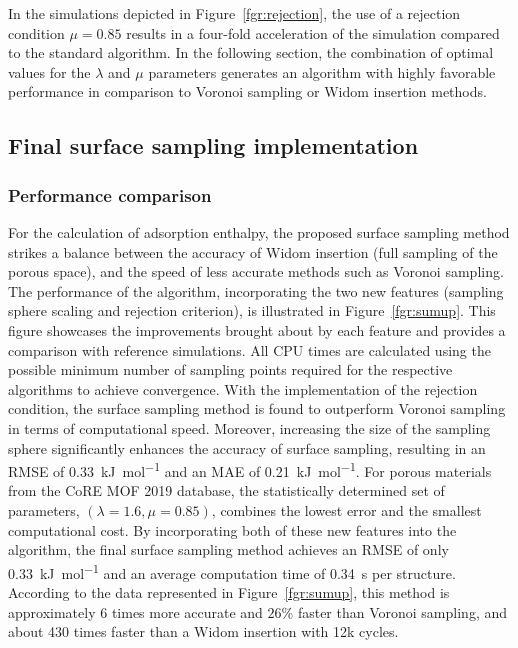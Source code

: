 \documentclass[main]{subfiles}
\begin{document}
In the simulations depicted in Figure~\ref{fgr:rejection}, the use of a rejection condition $\mu = 0.85$ results in a four-fold acceleration of the simulation compared to the standard algorithm. In the following section, the combination of optimal values for the $\lambda$ and $\mu$ parameters generates an algorithm with highly favorable performance in comparison to Voronoi sampling or Widom insertion methods.

\subsection{Final surface sampling implementation}\label{sct:final_sampling}

\subsubsection{Performance comparison}

For the calculation of adsorption enthalpy, the proposed surface sampling method strikes a balance between the accuracy of Widom insertion (full sampling of the porous space), and the speed of less accurate methods such as Voronoi sampling. The performance of the algorithm, incorporating the two new features (sampling sphere scaling and rejection criterion), is illustrated in Figure~\ref{fgr:sumup}. This figure showcases the improvements brought about by each feature and provides a comparison with reference simulations. All CPU times are calculated using the possible minimum number of sampling points required for the respective algorithms to achieve convergence. With the implementation of the rejection condition, the surface sampling method is found to outperform Voronoi sampling in terms of computational speed. Moreover, increasing the size of the sampling sphere significantly enhances the accuracy of surface sampling, resulting in an RMSE of \SI{0.33}{\kilo\joule\per\mole} {and an MAE of \SI{0.21}{\kilo\joule\per\mole}}. For porous materials from the CoRE MOF 2019 database, the statistically determined set of parameters, $(\lambda = 1.6, \mu = 0.85)$, combines the lowest error and the smallest computational cost. By incorporating both of these new features into the algorithm, the final surface sampling method achieves an RMSE of only \SI{0.33}{\kilo\joule\per\mole} and an average computation time of \SI{0.34}{\second} per structure. According to the data represented in Figure~\ref{fgr:sumup}, this method is approximately 6 times more accurate and {$26$\%} faster than Voronoi sampling, and about 430 times faster than a Widom insertion with 12k cycles.
\end{document}
